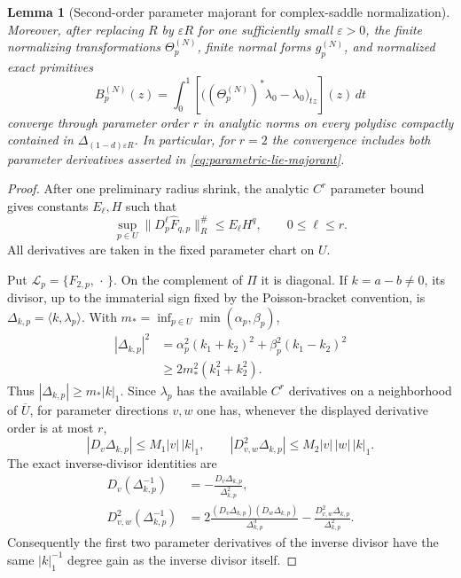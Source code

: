\documentclass[11pt]{amsart}
\numberwithin{equation}{section}
\newtheorem{lemma}[theorem]{Lemma}
\theoremstyle{definition}
\theoremstyle{remark}
\begin{document}
\begin{lemma}[Second-order parameter majorant for complex-saddle
normalization]
Moreover, after replacing $R$ by $\varepsilon R$ for one sufficiently
small $\varepsilon>0$, the finite normalizing transformations
$\Theta_p^{(N)}$, finite normal forms $g_p^{(N)}$, and normalized exact
primitives
\begin{equation}\label{eq:finite-normal-form-primitives}
 B_p^{(N)}(z)
 =\int_0^1
 \left[
  \bigl((\Theta_p^{(N)})^*\lambda_0-\lambda_0\bigr)_{tz}
 \right](z)\,dt
\end{equation}
converge through parameter order $r$ in analytic norms on every polydisc
compactly contained in $\Delta_{(1-d)\varepsilon R}$.  In particular, for
$r=2$ the convergence includes both parameter derivatives asserted in
\eqref{eq:parametric-lie-majorant}.
\end{lemma}

\begin{proof}
After one preliminary radius shrink, the analytic $C^r$ parameter bound
gives constants $E_\ell,H$ such that
\begin{equation}\label{eq:input-homogeneous-majorant}
 \sup_{p\in U}\|D_p^\ell\widehat F_{q,p}\|_R^\#
 \le E_\ell H^q,
 \qquad 0\le\ell\le r.
\end{equation}
All derivatives are taken in the fixed parameter chart on $U$.

Put $\mathcal L_p=\{F_{2,p},\,\cdot\,\}$.  On the complement of $\Pi$ it
is diagonal.  If $k=a-b\ne0$, its divisor, up to the immaterial sign fixed
by the Poisson-bracket convention, is
$\Delta_{k,p}=\langle k,\lambda_p\rangle$.  With
$m_*=\inf_{p\in U}\min(\alpha_p,\beta_p)$,
\begin{equation}\label{eq:uniform-complex-saddle-divisor}
 \begin{split}
 |\Delta_{k,p}|^2
 &=\alpha_p^2(k_1+k_2)^2+\beta_p^2(k_1-k_2)^2\\
 &\ge2m_*^2(k_1^2+k_2^2).
 \end{split}
\end{equation}
Thus $|\Delta_{k,p}|\ge m_*|k|_1$.  Since $\lambda_p$ has the available
$C^r$ derivatives on a neighborhood of $\overline U$, for parameter
directions $v,w$ one has, whenever the displayed derivative order is at
most $r$,
\[
 |D_v\Delta_{k,p}|\le M_1|v|\,|k|_1,
 \qquad
 |D^2_{v,w}\Delta_{k,p}|\le M_2|v|\,|w|\,|k|_1.
\]
The exact inverse-divisor identities are
\begin{align}
 D_v(\Delta_{k,p}^{-1})
 &=-\frac{D_v\Delta_{k,p}}{\Delta_{k,p}^2},
 \label{eq:first-divisor-derivative}\\
 D^2_{v,w}(\Delta_{k,p}^{-1})
 &=2\frac{(D_v\Delta_{k,p})(D_w\Delta_{k,p})}
          {\Delta_{k,p}^3}
   -\frac{D^2_{v,w}\Delta_{k,p}}{\Delta_{k,p}^2}.
 \label{eq:second-divisor-derivative}
\end{align}
Consequently the first two parameter derivatives of the inverse divisor
have the same $|k|_1^{-1}$ degree gain as the inverse divisor itself.


\end{proof}
\end{document}
